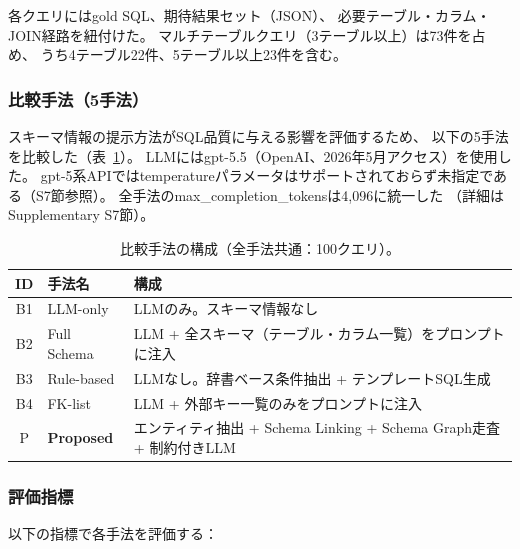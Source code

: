 \documentclass[5p,twocolumn]{elsarticle}
\begin{document}
各クエリにはgold SQL、期待結果セット（JSON）、
必要テーブル・カラム・JOIN経路を紐付けた。
マルチテーブルクエリ（3テーブル以上）は73件を占め、
うち4テーブル22件、5テーブル以上23件を含む。

\subsubsection{比較手法（5手法）}

スキーマ情報の提示方法がSQL品質に与える影響を評価するため、
以下の5手法を比較した（表~\ref{tab:methods}）。
LLMにはgpt-5.5（OpenAI、2026年5月アクセス）を使用した。
gpt-5系APIではtemperatureパラメータはサポートされておらず未指定である（S7節参照）。
全手法のmax\_completion\_tokensは4{,}096に統一した
（詳細はSupplementary S7節）。

\begin{table}[htbp]
  \centering
  \caption{比較手法の構成（全手法共通：100クエリ）。}
  \label{tab:methods}
  \small
  \begin{tabularx}{\textwidth}{clX}
    \toprule
    ID & 手法名 & 構成 \\
    \midrule
    B1 & LLM-only & LLMのみ。スキーマ情報なし \\
    B2 & Full Schema & LLM + 全スキーマ（テーブル・カラム一覧）をプロンプトに注入 \\
    B3 & Rule-based & LLMなし。辞書ベース条件抽出 + テンプレートSQL生成 \\
    B4 & FK-list & LLM + 外部キー一覧のみをプロンプトに注入 \\
    P & \textbf{Proposed} & エンティティ抽出 + Schema Linking + Schema Graph走査 + 制約付きLLM \\
    \bottomrule
  \end{tabularx}
\end{table}

\subsubsection{評価指標}
\label{sec:metrics}

以下の指標で各手法を評価する：
\end{document}
